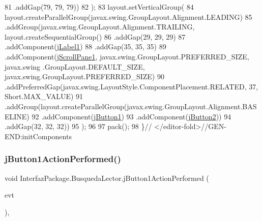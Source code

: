 \begin{DoxyCode}
81                 .addGap(79, 79, 79))
82         );
83         layout.setVerticalGroup(
84             layout.createParallelGroup(javax.swing.GroupLayout.Alignment.LEADING)
85             .addGroup(javax.swing.GroupLayout.Alignment.TRAILING, layout.createSequentialGroup()
86                 .addGap(29, 29, 29)
87                 .addComponent(\mbox{\hyperlink{class_interfaz_package_1_1_busqueda_lector_a449890b71a3ddf1a45b169af153b364c}{jLabel1}})
88                 .addGap(35, 35, 35)
89                 .addComponent(\mbox{\hyperlink{class_interfaz_package_1_1_busqueda_lector_abc4a324ddee78d264865afedf117ff86}{jScrollPane1}}, javax.swing.GroupLayout.PREFERRED\_SIZE, javax.swing
      .GroupLayout.DEFAULT\_SIZE, javax.swing.GroupLayout.PREFERRED\_SIZE)
90                 .addPreferredGap(javax.swing.LayoutStyle.ComponentPlacement.RELATED, 37, Short.MAX\_VALUE)
91                 .addGroup(layout.createParallelGroup(javax.swing.GroupLayout.Alignment.BASELINE)
92                     .addComponent(\mbox{\hyperlink{class_interfaz_package_1_1_busqueda_lector_aafddbf0bf8e006576588abc987d139da}{jButton1}})
93                     .addComponent(\mbox{\hyperlink{class_interfaz_package_1_1_busqueda_lector_a4c37aae2d858c81bf7cd2590bf39f62b}{jButton2}}))
94                 .addGap(32, 32, 32))
95         );
96 
97         pack();
98     \}\textcolor{comment}{// </editor-fold>//GEN-END:initComponents}
\end{DoxyCode}
\mbox{\label{class_interfaz_package_1_1_busqueda_lector_aca34c3e668393db6c3cc644af9fbade9}} 
\subsubsection{\texorpdfstring{j\+Button1\+Action\+Performed()}{jButton1ActionPerformed()}}
{\footnotesize\ttfamily void Interfaz\+Package.\+Busqueda\+Lector.\+j\+Button1\+Action\+Performed (\begin{DoxyParamCaption}\item[{java.\+awt.\+event.\+Action\+Event}]{evt }\end{DoxyParamCaption})\hspace{0.3cm}{\ttfamily [inline]}, {\ttfamily [private]}}


